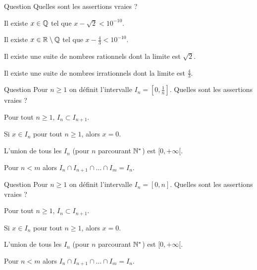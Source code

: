 \begin{multi}[multiple,feedback=
{Tout est vrai ! Ce sont des conséquences de la densité de \(\Qq\) dans \(\Rr\) et de la densité de \(\Rr \setminus \Qq\) dans \(\Rr\).
}]{Question}
Quelles sont les assertions vraies ?

    \item* Il existe \(x\in\mathbb{Q}\) tel que \(x-\sqrt2 < 10^{-10}\).
    \item* Il existe \(x\in\mathbb{R}\setminus\mathbb{Q}\) tel que \(x-\frac43 < 10^{-10}\).
    \item* Il existe une suite de nombres rationnels dont la limite est \(\sqrt 2\).
    \item* Il existe une suite de nombres irrationnels dont la limite est \(\frac43\).
\end{multi}


\begin{multi}[multiple,feedback=
{On a \([0,1] = I_1 \supset I_2 \supset I_3 \supset \cdots\).
}]{Question}
Pour \(n\ge 1\) on définit l'intervalle \(I_n = [0,\frac1n]\). 
Quelles sont les assertions vraies ?

    \item Pour tout \(n\ge 1\), \(I_n \subset I_{n+1}\).
    \item* Si \(x \in I_n\) pour tout \(n\ge1\), alors \(x=0\).
    \item L'union de tous les \(I_n\) (pour \(n\) parcourant \(\mathbb{N}^*\)) est \([0,+\infty[\).
    \item Pour \(n < m\) alors \(I_n \cap I_{n+1} \cap \ldots \cap I_m = I_n\).
\end{multi}


\begin{multi}[multiple,feedback=
{On a \([0,1] = I_1 \subset I_2 \subset I_3 \subset \cdots\).
}]{Question}
Pour \(n\ge 1\) on définit l'intervalle \(I_n = [0,n]\). 
Quelles sont les assertions vraies ?

    \item* Pour tout \(n\ge 1\), \(I_n \subset I_{n+1}\).
    \item Si \(x \in I_n\) pour tout \(n\ge1\), alors \(x=0\).
    \item* L'union de tous les \(I_n\) (pour \(n\) parcourant \(\mathbb{N}^*\)) est \([0,+\infty[\).
    \item* Pour \(n < m\) alors \(I_n \cap I_{n+1} \cap \ldots \cap I_m = I_n\).
\end{multi}


